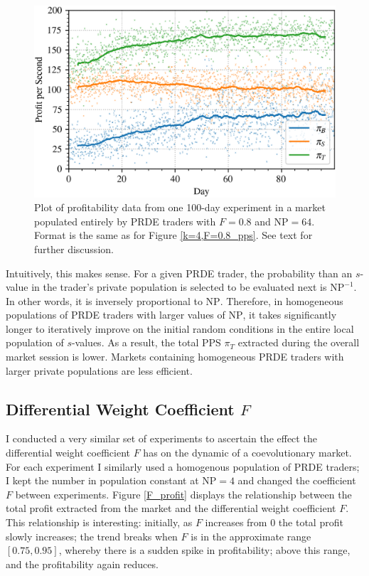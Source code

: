 \documentclass[conference]{IEEEtran}
\begin{document}
\begin{figure}[htbp]
    \centerline{\includegraphics[width=\columnwidth]{k=64,F=0.8_pps.png}}
    \caption{
        Plot of profitability data from one 100-day experiment in a market populated entirely by PRDE traders with $F=0.8$ and $\mathrm{NP}=64$.
        Format is the same as for Figure \ref{k=4,F=0.8_pps}.
        See text for further discussion.
    }
    \label{k=64,F=0.8_pps}
\end{figure}

Intuitively, this makes sense.
For a given PRDE trader, the probability than an $s$-value in the trader's private population is selected to be evaluated next is $\mathrm{NP}^{-1}$.
In other words, it is inversely proportional to $\mathrm{NP}$.
Therefore, in homogeneous populations of PRDE traders with larger values of $\mathrm{NP}$, it takes significantly longer to iteratively improve on the initial random conditions in the entire local population of $s$-values.
As a result, the total PPS $\pi_T$ extracted during the overall market session is lower.
Markets containing homogeneous PRDE traders with larger private populations are less efficient.

\subsection{Differential Weight Coefficient $F$}

I conducted a very similar set of experiments to ascertain the effect the differential weight coefficient $F$ has on the dynamic of a coevolutionary market.
For each experiment I similarly used a homogenous population of PRDE traders; I kept the number in population constant at $\mathrm{NP}=4$ and changed the coefficient $F$ between experiments.
Figure \ref{F_profit} displays the relationship between the total profit extracted from the market and the differential weight coefficient $F$.
This relationship is interesting: initially, as $F$ increases from $0$ the total profit slowly increases; the trend breaks when $F$ is in the approximate range $[0.75, 0.95]$, whereby there is a sudden spike in profitability; above this range, and the profitability again reduces.
\end{document}
